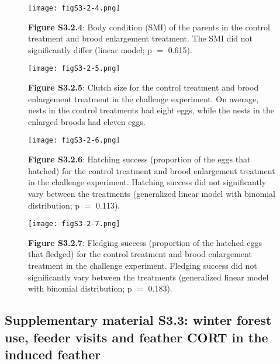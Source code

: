 \documentclass[10pt, twoside]{book} %
\begin{document}
\begin{figure}[h]
	\begin{center}
		\texttt{[image: figS3-2-4.png]}
	\end{center}
	\caption*{\textbf{Figure S3.2.4}: Body condition (SMI) of the parents in the control treatment and brood enlargement treatment. The SMI did not significantly differ (linear model; p $=$ 0.615).}
\end{figure}

\begin{figure}[h]
	\begin{center}
		\texttt{[image: figS3-2-5.png]}
	\end{center}
	\caption*{\textbf{Figure S3.2.5}: Clutch size for the control treatment and brood enlargement treatment in the challenge experiment. On average, nests in the control treatments had eight eggs, while the nests in the enlarged broods had eleven eggs.}
\end{figure}

\begin{figure}[h]
	\begin{center}
		\texttt{[image: figS3-2-6.png]}
	\end{center}
	\caption*{\textbf{Figure S3.2.6}: Hatching success (proportion of the eggs that hatched) for the control treatment and brood enlargement treatment in the challenge experiment. Hatching success did not significantly vary between the treatments (generalized linear model with binomial distribution; p $=$ 0.113).}
\end{figure}

\begin{figure}[h]
	\begin{center}
		\texttt{[image: figS3-2-7.png]}
	\end{center}
	\caption*{\textbf{Figure S3.2.7}: Fledging success (proportion of the hatched eggs that fledged) for the control treatment and brood enlargement treatment in the challenge experiment. Fledging success did not significantly vary between the treatments (generalized linear model with binomial distribution; p $=$ 0.183).}
\end{figure}


\clearpage
\subsection*{Supplementary material S3.3: winter forest use, feeder visits and feather CORT in the induced feather}
\end{document}
